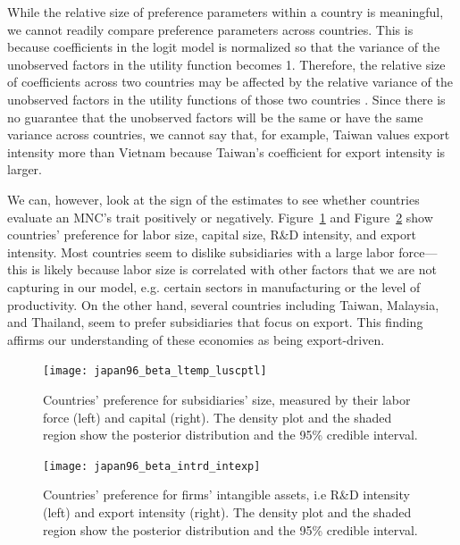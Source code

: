 While the relative size of preference parameters within a country is meaningful,
we cannot readily compare preference parameters across countries. This is
because coefficients in the logit model is normalized so that the variance of
the unobserved factors in the utility function becomes 1. Therefore, the
relative size of coefficients across two countries may be affected by the
relative variance of the unobserved factors in the utility functions of those
two countries \citep[chap. 2]{Train2009}. Since there is no guarantee that the
unobserved factors will be the same or have the same variance across countries,
we cannot say that, for example, Taiwan values export intensity more than
Vietnam because Taiwan's coefficient for export intensity is larger.

We can, however, look at the sign of the estimates to see whether countries
evaluate an MNC's trait positively or negatively.
Figure~\ref{fig:japan96_beta_ltemp_luscptl} and
Figure~\ref{fig:japan96_beta_intrd_intexp} show countries' preference for labor
size, capital size, R\&D intensity, and export intensity. Most countries seem to
dislike subsidiaries with a large labor force---this is likely because labor
size is correlated with other factors that we are not capturing in our model,
e.g. certain sectors in manufacturing or the level of productivity. On the other
hand, several countries including Taiwan, Malaysia, and Thailand, seem to prefer
subsidiaries that focus on export. This finding affirms our understanding of
these economies as being export-driven.

\begin{figure}[tbp] \centering
  \texttt{[image: japan96\_beta\_ltemp\_luscptl]}
  \caption[Countries' preference for subsidiaries' size.]{Countries' preference
    for subsidiaries' size, measured by their labor force (left) and capital
    (right). The density plot and the shaded region show the posterior
    distribution and the 95\% credible interval.}
  \label{fig:japan96_beta_ltemp_luscptl}
\end{figure}

\begin{figure}[tbp] \centering
  \texttt{[image: japan96\_beta\_intrd\_intexp]}
  \caption[Countries' preference for firms' intangible assets.]{Countries'
    preference for firms' intangible assets, i.e R\&D intensity (left) and
    export intensity (right). The density plot and the shaded region show the
    posterior distribution and the 95\% credible interval.}
  \label{fig:japan96_beta_intrd_intexp}
\end{figure}

